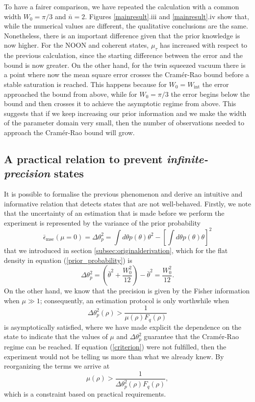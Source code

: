 To have a fairer comparison, we have repeated the calculation with a common width $W_0 = \pi/3$ and $\bar{n} = 2$. Figures \ref{mainresult}.iii and \ref{mainresult}.iv show that, while the numerical values are different, the qualitative conclusions are the same. Nonetheless, there is an important difference given that the prior knowledge is now higher. For the NOON and coherent states, $\mu_{\tau}$ has increased with respect to the previous calculation, since the starting difference between the error and the bound is now greater. On the other hand, for the twin squeezed vacuum there is a point where now the mean square error crosses the Cram\'{e}r-Rao bound before a stable saturation is reached. This happens because for $W_0 = W_{\mathrm{int}}$ the error approached the bound from above, while for $W_0 = \pi/3$ the error begins below the bound and then crosses it to achieve the asymptotic regime from above. This suggests that if we keep increasing our prior information and we make the width of the parameter domain very small, then the number of observations needed to approach the Cram\'{e}r-Rao bound will grow. 

\subsection{A practical relation to prevent \emph{infinite-precision} states}
\label{subsec:infiniteprecision}

It is possible to formalise the previous phenomenon and derive an intuitive and informative relation that detects states that are not well-behaved. Firstly, we note that the uncertainty of an estimation that is made before we perform the experiment is represented by the variance of the prior probability 
\begin{equation}
\bar{\epsilon}_{\mathrm{mse}}({\mu = 0}) = \Delta \theta^2_p = \int d\theta p(\theta) \theta^2 - \left[\int d\theta p(\theta) \theta \right]^2
\end{equation}
that we introduced in section \ref{subsec:originalderivation}, which for the flat density in equation (\ref{prior_probability}) is
\begin{equation}
\Delta \theta^2_p = \left(\bar{\theta}^2 + \frac{W_0^2}{12}\right) - \bar{\theta}^2 = \frac{W_0^2}{12}.
\end{equation}
On the other hand, we know that the precision is given by the Fisher information when $\mu \gg 1$; consequently, an estimation protocol is only worthwhile when
\begin{equation}
\Delta \theta^2_p(\rho) > \frac{1}{\mu(\rho) F_q(\rho)}
\label{criterion}
\end{equation}
is asymptotically satisfied, where we have made explicit the dependence on the state to indicate that the values of $\mu$ and $\Delta \theta^2_p$ guarantee that the Cram\'{e}r-Rao regime can be reached. If equation (\ref{criterion}) were not fulfilled, then the experiment would not be telling us more than what we already knew. By reorganizing the terms we  arrive at
\begin{equation}
\mu(\rho) > \frac{1}{\Delta \theta^2_p(\rho) F_q(\rho)},
\label{fundamental}
\end{equation}
which is a constraint based on practical requirements.

